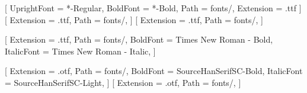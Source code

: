 \usepackage{fontspec}
\newfontfamily{}[
  UprightFont = *-Regular,
  BoldFont    = *-Bold,
  Path        = fonts/,
  Extension   = .ttf
]
\newfontface{}[
  Extension = .ttf,
  Path      = fonts/,
]
\newfontface{}[
    Extension = .ttf,
    Path      = fonts/,
]

\setmainfont{Times New Roman}[
  Extension = .ttf,
  Path      = fonts/,
  BoldFont  = Times New Roman - Bold,
  ItalicFont = Times New Roman - Italic,
]

\usepackage{xeCJK}
[
  Extension   = .otf,
  Path        = fonts/,
  BoldFont    = SourceHanSerifSC-Bold,
  ItalicFont = SourceHanSerifSC-Light,
]
[
  Extension   = .otf,
  Path        = fonts/,
]

